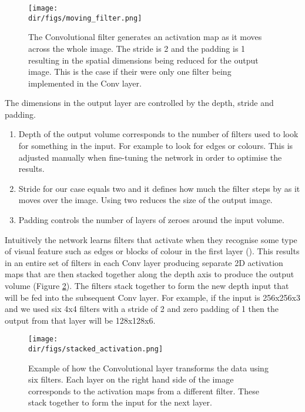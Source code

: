 \begin{figure}[htbp]
    \centering
    \texttt{[image: \\dir/figs/moving\_filter.png]}
    \caption[Example of one Convolutional filter]{The Convolutional filter generates an activation map as it moves across the whole image. The stride is 2 and the padding is 1 resulting in the spatial dimensions being reduced for the output image. This is the case if their were only one filter being implemented in the Conv layer.}
    \label{fig.moving_filter}
\end{figure}
The dimensions in the output layer are controlled by the depth, stride and padding. 
\begin{enumerate}
    \item Depth of the output volume corresponds to the number of filters used to look for something in the input. For example to look for edges or colours. This is adjusted manually when fine-tuning the network in order to optimise the results.
    \item Stride for our case equals two and it defines how much the filter steps by as it moves over the image. Using two reduces the size of the output image.
    \item Padding controls the number of layers of zeroes around the input volume. 
\end{enumerate}
Intuitively the network learns filters that activate when they recognise some type of visual feature such as edges or blocks of colour in the first layer (\cite{karpathy_cnn1}). This results in an entire set of filters in each Conv layer producing separate 2D activation maps that are then stacked together along the depth axis to produce the output volume (Figure \ref{fig.conv_filter}). The filters stack together to form the new depth input that will be fed into the subsequent Conv layer. For example, if the input is 256x256x3 and we used six 4x4 filters with a stride of 2 and zero padding of 1 then the output from that layer will be 128x128x6. 

\begin{figure}[htbp]
    \centering
    \texttt{[image: \\dir/figs/stacked\_activation.png]}
    \caption[Example of how the Convolutional layer transforms the data using six filters]{Example of how the Convolutional layer transforms the data using six filters. Each layer on the right hand side of the image corresponds to the activation maps from a different filter. These stack together to form the input for the next layer.}
    \label{fig.conv_filter}
\end{figure}

